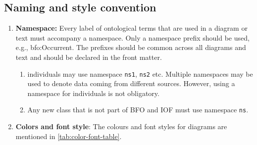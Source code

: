 \subsection*{Naming and style convention}

\begin{enumerate}
    \item \textbf{Namespace:} Every label of ontological terms that are used in a diagram or text must accompany a namespace. Only a namespace prefix should be used, e.g., bfo:Occurrent. The prefixes should be common across all diagrams and text and should be declared in the front matter. 
        \begin{enumerate}
            \item individuals may use namespace \texttt{ns1}, \texttt{ns2} etc. Multiple namespaces may be used to denote data coming from different sources. However, using a namespace for individuals is not obligatory. 
            \item Any new class that is not part of BFO and IOF must use namespace \texttt{ns}.
        \end{enumerate}

    \item \textbf{Colors and font style}: The colours and font styles for diagrams are mentioned in \cref{tab:color-font-table}. 
    
\begin{table}[]
\caption{Colors and fonts}
\label{tab:color-font-table}
\end{table}


\end{enumerate}

